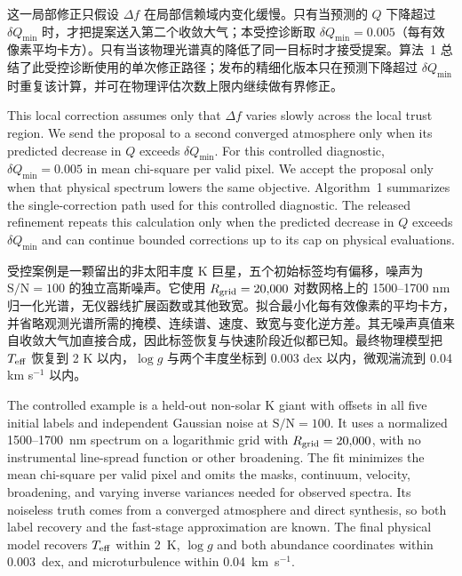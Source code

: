 这一局部修正只假设 $\Delta f$ 在局部信赖域内变化缓慢。只有当预测的 $Q$ 下降超过 $\delta Q_{\min}$ 时，才把提案送入第二个收敛大气；本受控诊断取 $\delta Q_{\min}=0.005$（每有效像素平均卡方）。只有当该物理光谱真的降低了同一目标时才接受提案。算法~1 总结了此受控诊断使用的单次修正路径；发布的精细化版本只在预测下降超过 $\delta Q_{\min}$ 时重复该计算，并可在物理评估次数上限内继续做有界修正。

\begin{EN}
This local correction assumes only
that $\Delta f$ varies slowly across the local trust region. We send the
proposal to a second converged atmosphere only when its predicted decrease in
$Q$ exceeds $\delta Q_{\min}$. For this controlled diagnostic,
$\delta Q_{\min}=0.005$ in mean chi-square per valid pixel. We accept the
proposal only when that physical spectrum lowers the same objective.
Algorithm~1 summarizes the
single-correction path used for this controlled diagnostic. The released
refinement repeats this calculation only when the predicted decrease in $Q$
exceeds $\delta Q_{\min}$ and can continue bounded corrections up to its cap on
physical evaluations.
\end{EN}

受控案例是一颗留出的非太阳丰度 K 巨星，五个初始标签均有偏移，噪声为 $\mathrm{S/N}=100$ 的独立高斯噪声。它使用 $R_{\rm grid}=20{,}000$ 对数网格上的 1500--1700 nm 归一化光谱，无仪器线扩展函数或其他致宽。拟合最小化每有效像素的平均卡方，并省略观测光谱所需的掩模、连续谱、速度、致宽与变化逆方差。其无噪声真值来自收敛大气加直接合成，因此标签恢复与快速阶段近似都已知。最终物理模型把 $T_{\rm eff}$ 恢复到 2 K 以内，$\log g$ 与两个丰度坐标到 0.003 dex 以内，微观湍流到 0.04 km s$^{-1}$ 以内。

\begin{EN}
The controlled example is a held-out non-solar K giant with offsets in all five
initial labels and independent Gaussian noise at $\mathrm{S/N}=100$. It uses a
normalized 1500--1700~nm spectrum on a logarithmic grid with
$R_{\rm grid}=20{,}000$, with no instrumental line-spread function or other
broadening. The fit minimizes the mean chi-square per valid pixel and omits
the masks, continuum, velocity, broadening, and varying inverse variances needed
for observed spectra. Its noiseless truth comes from a converged atmosphere and
direct synthesis, so both label recovery and the fast-stage approximation are
known. The final physical model recovers $T_{\rm eff}$ within 2~K, $\log g$ and both
abundance coordinates within
0.003~dex, and microturbulence within 0.04~km~s$^{-1}$.
\end{EN}

